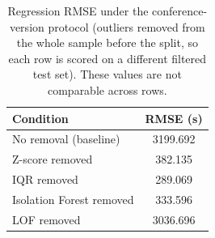 \begin{table}[!t]
\caption{Regression RMSE under the conference-version protocol (outliers removed from the whole sample before the split, so each row is scored on a different filtered test set). These values are not comparable across rows.}
\label{tab:ext_protocol}
\centering
\setlength{\tabcolsep}{3pt}
\footnotesize
\begin{tabular}{lc}
\hline
Condition & RMSE (s) \\
\hline
No removal (baseline) & 3199.692 \\
Z-score removed & 382.135 \\
IQR removed & 289.069 \\
Isolation Forest removed & 333.596 \\
LOF removed & 3036.696 \\
\hline
\end{tabular}
\end{table}